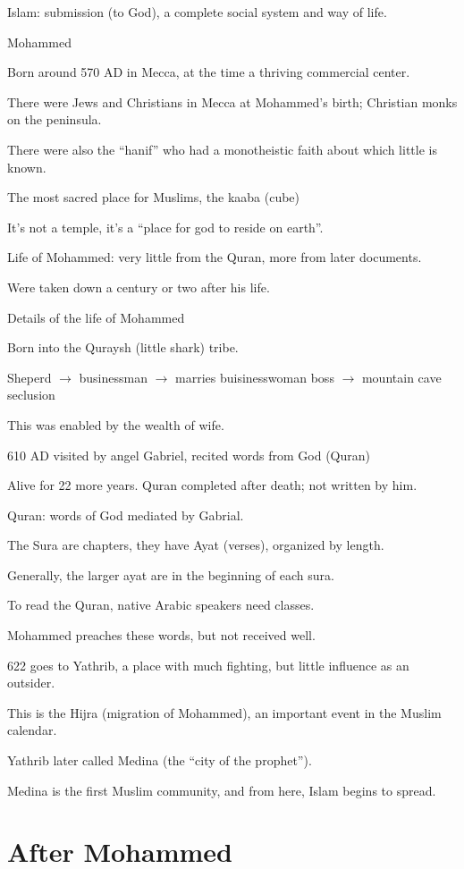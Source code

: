 \documentclass[12pt]{article}
\begin{document}
Islam: submission (to God), a complete social system and way of life.

\noindent
Mohammed

Born around 570 AD in Mecca, at the time a thriving commercial center.

There were Jews and Christians in Mecca at Mohammed's birth; Christian monks on the peninsula.

There were also the ``hanif'' who had a monotheistic faith about which little is known.

The most sacred place for Muslims, the kaaba (cube)

It's not a temple, it's a ``place for god to reside on earth''.

Life of Mohammed: very little from the Quran, more from later documents.

Were taken down a century or two after his life.

\noindent
Details of the life of Mohammed

Born into the Quraysh (little shark) tribe.

Sheperd $\to$ businessman $\to$ marries buisinesswoman boss $\to$ mountain cave seclusion

This was enabled by the wealth of wife.

610 AD visited by angel Gabriel, recited words from God (Quran)

Alive for 22 more years.  Quran completed after death; not written by him.

Quran: words of God mediated by Gabrial.

The Sura are chapters, they have Ayat (verses), organized by length.

Generally, the larger ayat are in the beginning of each sura.

To read the Quran, native Arabic speakers need classes.

Mohammed preaches these words, but not received well.

622 goes to Yathrib, a place with much fighting, but little influence as an outsider.

This is the Hijra (migration of Mohammed), an important event in the Muslim calendar.

Yathrib later called Medina (the ``city of the prophet'').

Medina is the first Muslim community, and from here, Islam begins to spread.

\section{After Mohammed}
\end{document}
